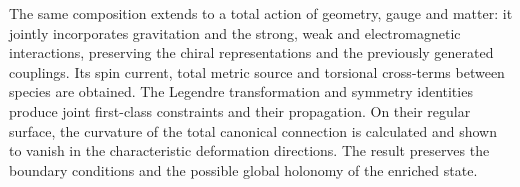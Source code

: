 The same composition extends to a total action of geometry, gauge and matter: it jointly incorporates gravitation and the strong, weak and electromagnetic interactions, preserving the chiral representations and the previously generated couplings. Its spin current, total metric source and torsional cross-terms between species are obtained. The Legendre transformation and symmetry identities produce joint first-class constraints and their propagation. On their regular surface, the curvature of the total canonical connection is calculated and shown to vanish in the characteristic deformation directions. The result preserves the boundary conditions and the possible global holonomy of the enriched state.

